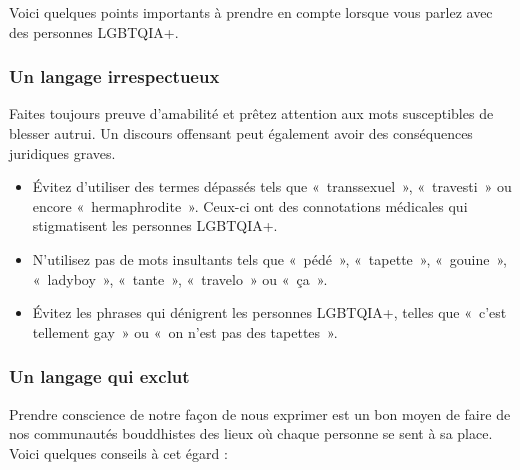 \documentclass[12pt,openany]{book}
\begin{document}
Voici quelques points importants à prendre en compte lorsque vous parlez avec des personnes \mbox{LGBTQIA+}.

\subsubsection*{Un langage irrespectueux}

\noindent Faites toujours preuve d’amabilité et prêtez attention aux mots susceptibles de blesser autrui. Un discours offensant peut également avoir des conséquences juridiques graves.

\begin{itemize}[label=\textbullet]
  \setlength\itemsep{-0.3em}
  \item Évitez d’utiliser des termes dépassés tels que \mbox{« transsexuel »}, \mbox{« travesti »} ou encore \mbox{« hermaphrodite »}. Ceux-ci ont des connotations médicales qui stigmatisent les personnes \mbox{LGBTQIA+}.
  \item N’utilisez pas de mots insultants tels que \mbox{« pédé »}, \mbox{« tapette »}, \mbox{« gouine »}, \mbox{« ladyboy »}, \mbox{« tante »}, \mbox{« travelo »} ou \mbox{« ça »}.
  \item Évitez les phrases qui dénigrent les personnes \mbox{LGBTQIA+}, telles que \mbox{« c}’est tellement ga\mbox{y »} ou \mbox{« o}n n’est pas des tapette\mbox{s »}.
\end{itemize}

\subsubsection*{Un langage qui exclut}

\noindent Prendre conscience de notre façon de nous exprimer est un bon moyen de faire de nos communautés bouddhistes des lieux où chaque personne se sent à sa place. Voici quelques conseils à cet égard :
\end{document}
